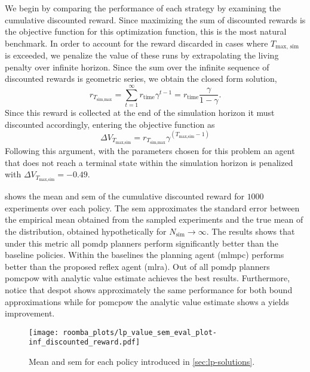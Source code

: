 We begin by comparing the performance of each strategy by examining the
cumulative discounted reward. Since maximizing the sum of discounted rewards is
the objective function for this optimization function, this is the most natural
benchmark. In order to account for the reward discarded in cases where
$T_\text{max, sim}$ is exceeded, we penalize the value of these runs by
extrapolating the living penalty over infinite horizon. Since the sum over the
infinite sequence of discounted rewards is geometric series, we obtain the
closed form solution,
\begin{equation}
  r_{T_\text{sim,max}} = \sum_{t=1}^\infty r_\text{time} \gamma^{t-1} =  r_\text{time} \frac{\gamma}{1-\gamma}.
\end{equation}
Since this reward is collected at the end of the simulation horizon it must
discounted accordingly, entering the objective function as
\begin{equation}
  \Delta V_{T_\text{max,sim}} = r_{T_\text{sim,max}} \gamma^{(T_\text{max,sim} - 1)}
\end{equation}
Following this argument, with the parameters chosen for this problem an agent
that does not reach a terminal state within the simulation horizon is penalized
with $\Delta V_{T_\text{max,sim}} = -0.49$.

 shows the mean and \ac{sem} of the cumulative
discounted reward for $1000$ experiments over each policy. The \ac{sem}
approximates the standard error between the empirical mean obtained from the
sampled experiments and the true mean of the distribution, obtained
hypothetically for $N_\text{sim} \to \infty$. The results shows that under this
metric all \ac{pomdp} planners perform significantly better than the baseline
policies. Within the baselines the planning agent (\ac{mlmpc}) performs better
than the proposed reflex agent (\ac{mlra}). Out of all \ac{pomdp} planners
\ac{pomcpow} with analytic value estimate achieves the best results. Furthermore,
notice that \ac{despot} shows approximately the same performance for both bound
approximations while for \ac{pomcpow} the analytic value estimate shows a yields
improvement.

\begin{figure}[H]
  \centering
  \texttt{[image: roomba\_plots/lp\_value\_sem\_eval\_plot-inf\_discounted\_reward.pdf]}
  \caption{Mean and \acf{sem} for each policy introduced in \cref{sec:lp-solutions}.}
  \label{fig:lp-value-sem-inf-discounted}
\end{figure}

